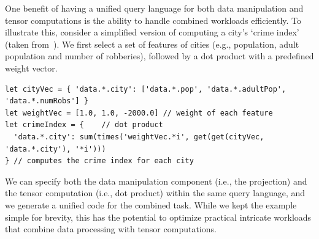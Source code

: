 \documentclass[runningheads]{llncs}
\newcommand{\lang}{Rhyme}
\begin{document}
One benefit of having a unified query language for both data manipulation and tensor
computations is the ability to handle combined workloads efficiently.
To illustrate this, consider a simplified version of computing a city's
`crime index' (taken from~\cite{weld}).
We first select a set of features of cities (e.g., population, 
adult population and number of robberies), followed by a dot product
with a predefined weight vector.

\begin{lstlisting}[style=JavaScript,columns=flexible]
let cityVec = { 'data.*.city': ['data.*.pop', 'data.*.adultPop', 'data.*.numRobs'] }
let weightVec = [1.0, 1.0, -2000.0] // weight of each feature
let crimeIndex = {    // dot product
  'data.*.city': sum(times('weightVec.*i', get(get(cityVec, 'data.*.city'), '*i')))
} // computes the crime index for each city
\end{lstlisting}

We can specify both the data manipulation component (i.e., the projection) and
the tensor computation (i.e., dot product) within the same query language, and
we generate a unified code for the combined task.
While we kept the example simple for brevity, this has the potential to optimize practical
intricate workloads that combine data processing with tensor computations.






\end{document}
